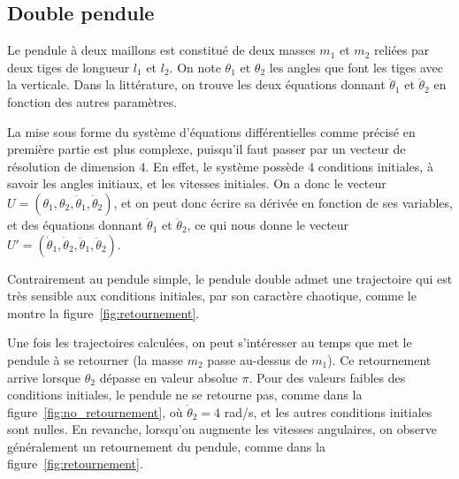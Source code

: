 \subsection{Double pendule}

Le pendule à deux maillons est constitué de deux masses $ m_1 $ et $ m_2 $ 
reliées par deux tiges de longueur $ l_1 $ et $ l _2 $. On note $ \theta_1 $ et $ \theta_2 $ les angles
que font les tiges avec la verticale. Dans la littérature, on trouve les deux équations donnant $\ddot \theta_1$ et $\ddot \theta_2$ en fonction des autres paramètres.

La mise sous forme du système d'équations différentielles comme précisé en première partie est plus complexe,
puisqu'il faut passer par un vecteur de résolution de dimension $4$.
En effet, le système possède $4$ conditions initiales, à savoir les angles initiaux, et les vitesses initiales.
On a donc le vecteur $ U = (\theta_1, \theta_2, \dot \theta_1, \dot \theta_2) $, et on peut donc écrire sa dérivée en fonction de ses variables, et des équations donnant $\ddot \theta_1$ et $\ddot \theta_2$,
ce qui nous donne le vecteur $ U' = (\dot \theta_1, \dot \theta_2, \ddot \theta_1, \ddot \theta_2) $.

Contrairement au pendule simple, le pendule double admet une trajectoire qui est très sensible aux conditions initiales, par son caractère chaotique, comme le montre la figure~\ref{fig:retournement}.

Une fois les trajectoires calculées, on peut s'intéresser au temps que met le pendule à se retourner (la masse $ m_2 $ passe au-dessus de $ m_1 $).
Ce retournement arrive lorsque $ \theta_2 $ dépasse en valeur absolue $ \pi $.
Pour des valeurs faibles des conditions initiales, le pendule ne se retourne pas, comme dans la figure~\ref{fig:no_retournement},
où $ \dot \theta_2 = 4 $ rad/s, et les autres conditions initiales sont nulles.
En revanche, lorsqu'on augmente les vitesses angulaires, on observe généralement un retournement du pendule, comme dans la figure~\ref{fig:retournement}.

